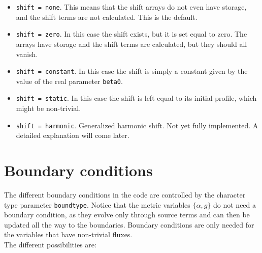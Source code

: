\documentclass[12pt]{article}
\begin{document}
\begin{itemize}

\item \texttt{shift = none}. This means that the shift arrays do not
even have storage, and the shift terms are not calculated.  This is
the default.

\item \texttt{shift = zero}. In this case the shift exists, but it is
set equal to zero.  The arrays have storage and the shift terms are
calculated, but they should all vanish.

\item \texttt{shift = constant}.  In this case the shift is simply a
constant given by the value of the real parameter \texttt{beta0}.

\item \texttt{shift = static}.  In this case the shift is left
equal to its initial profile, which might be non-trivial.

\item \texttt{shift = harmonic}.  Generalized harmonic shift.  Not yet
fully implemented.  A detailed explanation will come later.

\end{itemize}



\setcounter{equation}{0}
\section{Boundary conditions}
\label{sec:boundary}

The different boundary conditions in the code are controlled by the
character type parameter \texttt{boundtype}.  Notice that
the metric variables $\{\alpha,g\}$ do not need a boundary condition,
as they evolve only through source terms and can then be updated all
the way to the boundaries.  Boundary conditions are only needed for
the variables that have non-trivial fluxes. \\

The different possibilities are:
\end{document}
